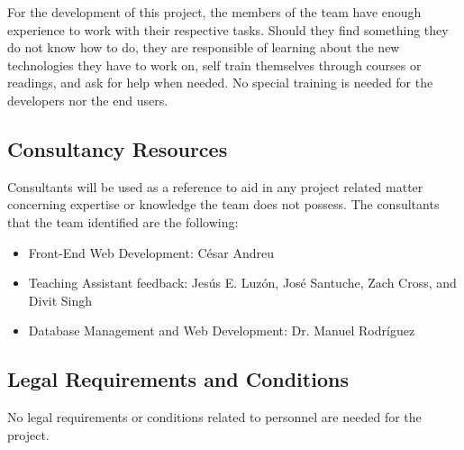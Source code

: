 For the development of this project, the members of the team have enough
experience to work with their respective tasks. Should they find something they
do not know how to do, they are responsible of learning about the new
technologies they have to work on, self train themselves through courses or
readings, and ask for help when needed. No special training is needed for the developers nor the end users.

\subsection{Consultancy Resources}

Consultants will be used as a reference to aid in any project
related matter concerning expertise or knowledge the team does not possess. The consultants that the team identified are the following:

\begin{itemize}
\item Front-End Web Development: César Andreu
\item Teaching Assistant feedback: Jesús E. Luzón, José Santuche, Zach Cross, and Divit Singh
\item Database Management and Web Development: Dr. Manuel Rodríguez
\end{itemize}

\subsection{Legal Requirements and Conditions}

No legal requirements or conditions related to
personnel are needed for the project.